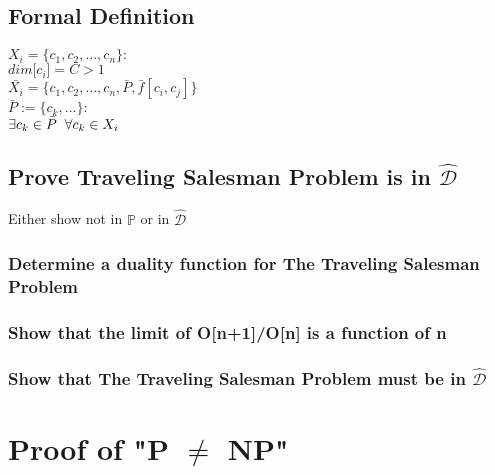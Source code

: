 \documentclass[11pt]{article}
\begin{document}
\subsection{Formal Definition}
\begin{center}
$
X_i = \{ c_1,c_2,...,c_n \} :
$
\\ \vspace{2mm}
$
dim\lbrack c_i \rbrack = C > 1
$
\\ \vspace{4mm} 
$
\bar{X_i} = \{ c_1,c_2,...,c_n,\bar{P},\bar{f}[c_i,c_j] \}
$
\\ \vspace{2mm}
$
\bar{P} := \{c_k,...\} :
$
\\ \vspace{2mm}
$
\exists c_k \in \bar{P} \hspace{2mm} \forall c_k \in X_i
$
\end{center}

\subsection{Prove Traveling Salesman Problem is in $\hat{\mathcal{D}}$}
Either show not in $\mathbb{P}$ or in $\hat{\mathcal{D}}$

\subsubsection{Determine a duality function for The Traveling Salesman Problem}
\subsubsection{Show that the limit of O[n+1]/O[n] is a function of n}
\subsubsection{Show that The Traveling Salesman Problem must be in $\hat{\mathcal{D}}$}





\newpage
\section{Proof of "P $\neq$ NP"}
\end{document}
